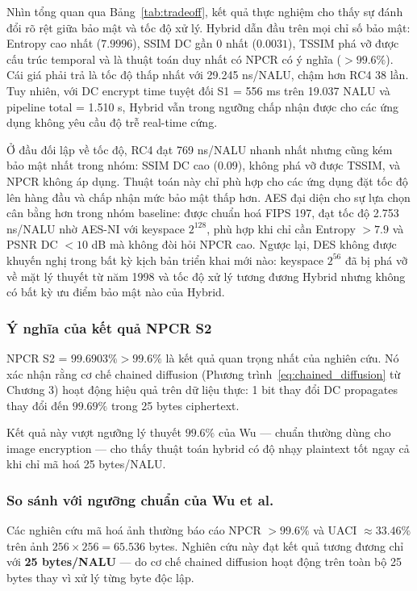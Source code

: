 Nhìn tổng quan qua Bảng~\ref{tab:tradeoff}, kết quả thực nghiệm cho thấy sự đánh đổi rõ rệt giữa bảo mật và tốc độ xử lý. Hybrid dẫn đầu trên mọi chỉ số bảo mật: Entropy cao nhất ($7.9996$), SSIM DC gần 0 nhất ($0.0031$), TSSIM phá vỡ được cấu trúc temporal và là thuật toán duy nhất có NPCR có ý nghĩa ($> 99.6\%$). Cái giá phải trả là tốc độ thấp nhất với 29.245 ns/NALU, chậm hơn RC4 38 lần. Tuy nhiên, với DC encrypt time tuyệt đối S1 = 556 ms trên 19.037 NALU và pipeline total = 1.510 s, Hybrid vẫn trong ngưỡng chấp nhận được cho các ứng dụng không yêu cầu độ trễ real-time cứng.

Ở đầu đối lập về tốc độ, RC4 đạt 769 ns/NALU nhanh nhất nhưng cũng kém bảo mật nhất trong nhóm: SSIM DC cao (0.09), không phá vỡ được TSSIM, và NPCR không áp dụng. Thuật toán này chỉ phù hợp cho các ứng dụng đặt tốc độ lên hàng đầu và chấp nhận mức bảo mật thấp hơn. AES đại diện cho sự lựa chọn cân bằng hơn trong nhóm baseline: được chuẩn hoá FIPS 197, đạt tốc độ 2.753 ns/NALU nhờ AES-NI với keyspace $2^{128}$, phù hợp khi chỉ cần Entropy $> 7.9$ và PSNR DC $< 10$ dB mà không đòi hỏi NPCR cao. Ngược lại, DES không được khuyến nghị trong bất kỳ kịch bản triển khai mới nào: keyspace $2^{56}$ đã bị phá vỡ về mặt lý thuyết từ năm 1998 và tốc độ xử lý tương đương Hybrid nhưng không có bất kỳ ưu điểm bảo mật nào của Hybrid.

\subsubsection{Ý nghĩa của kết quả NPCR S2}

NPCR S2 = $99.6903\% > 99.6\%$ là kết quả quan trọng nhất của nghiên cứu.
Nó xác nhận rằng cơ chế chained diffusion (Phương trình~\ref{eq:chained_diffusion}
từ Chương 3) hoạt động hiệu quả trên dữ liệu thực: 1 bit thay đổi DC
propagates thay đổi đến $99.69\%$ trong 25 bytes ciphertext.

Kết quả này vượt ngưỡng lý thuyết $99.6\%$ của Wu \cite{wu_npcr} --- chuẩn
thường dùng cho image encryption --- cho thấy thuật toán hybrid có độ nhạy plaintext
tốt ngay cả khi chỉ mã hoá 25 bytes/NALU.

\subsubsection{So sánh với ngưỡng chuẩn của Wu et al.}

Các nghiên cứu mã hoá ảnh thường báo cáo NPCR $>99.6\%$ và UACI $\approx 33.46\%$
trên ảnh $256 \times 256 = 65.536$ bytes. Nghiên cứu này đạt kết quả tương đương
chỉ với \textbf{25 bytes/NALU} --- do cơ chế chained diffusion hoạt động
trên toàn bộ 25 bytes thay vì xử lý từng byte độc lập.
